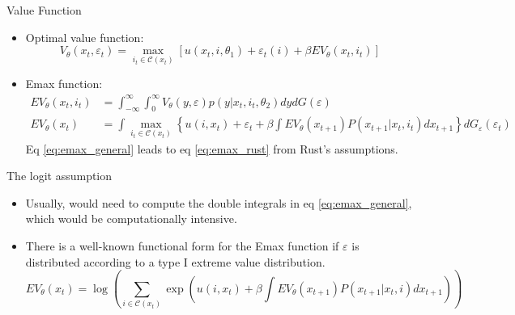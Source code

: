 \documentclass[aspectratio=169]{beamer}
\begin{document}
	\begin{frame}{Value Function}
		\begin{itemize}
			\itemsep1em
			\item Optimal value function: 
			\begin{equation}
				V_\theta(x_t,\varepsilon_t) = \max_{i_t \in \mathcal{C}(x_t)} [u(x_{t},i,\theta_1) + \varepsilon_t(i) + \beta EV_\theta(x_t,i_t)]
			\end{equation}
			\item Emax function:
			\begin{align}
				EV_\theta(x_t,i_t) &= \int_{-\infty}^\infty \int_0^\infty V_\theta(y,\varepsilon) p(y|x_t,i_t,\theta_2) dy dG(\varepsilon) \label{eq:emax_general}\\
				EV_\theta(x_t) &= \int \max_{i_t \in \mathcal{C}(x_t)} \left\{ u(i,x_{t}) + \varepsilon_t + \beta \int EV_\theta(x_{t+1})P(x_{t+1}|x_t,i_t) dx_{t+1} \right\} dG_\varepsilon(\varepsilon_t) \label{eq:emax_rust}
			\end{align}
			Eq \ref{eq:emax_general} leads to eq \ref{eq:emax_rust} from Rust's assumptions.
		\end{itemize}
	\end{frame}
	
	\begin{frame}{The logit assumption}
		\begin{itemize}
			\itemsep1em
			\item Usually, would need to compute the double integrals in eq \ref{eq:emax_general}, which would be computationally intensive.
			\item There is a well-known functional form for the Emax function if $\varepsilon$ is distributed according to a type I extreme value distribution.
			\begin{equation}
				EV_\theta(x_t) = \log \left( \sum_{i \in \mathcal{C}(x_t)} \exp \left( u(i,x_t) + \beta  \int EV_\theta(x_{t+1})P(x_{t+1}|x_t,i) dx_{t+1}  \right) \right)
			\end{equation}
		\end{itemize}
	\end{frame}
	
\end{document}
